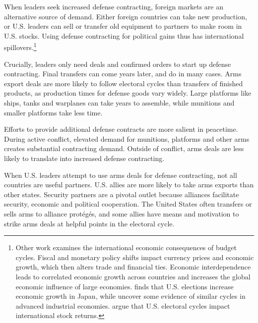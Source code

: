 \documentclass[12pt]{article}
\begin{document}
When leaders seek increased defense contracting, foreign markets are an alternative source of demand.
Either foreign countries can take new production, or U.S. leaders can sell or transfer old equipment to partners to make room in U.S. stocks. 
Using defense contracting for political gains thus has international spillovers.\footnote{%
Other work examines the international economic consequences of budget cycles.
Fiscal and monetary policy shifts impact currency prices and economic growth, which then alters trade and financial ties. 
Economic interdependence leads to correlated economic growth across countries \citep{ArtisZhang1999, Kayser2006} and increases the global economic influence of large economies. 
\citet{Ito1991} finds that U.S. elections increase economic growth in Japan, while \citet{ThompsonZuk1983} uncover some evidence of similar cycles in advanced industrial economies.
\citet{FoersterSchmitz1997} argue that U.S. electoral cycles impact international stock returns.
}


Crucially, leaders only need deals and confirmed orders to start up defense contracting. 
Final transfers can come years later, and do in many cases. 
Arms export deals are more likely to follow electoral cycles than transfers of finished products, as production times for defense goods vary widely. 
Large platforms like ships, tanks and warplanes can take years to assemble, while munitions and smaller platforms take less time. 


Efforts to provide additional defense contracts are more salient in peacetime. 
During active conflict, elevated demand for munitions, platforms and other arms creates substantial contracting demand. 
Outside of conflict, arms deals are less likely to translate into increased defense contracting. 


When U.S. leaders attempt to use arms deals for defense contracting, not all countries are useful partners. 
U.S. allies are more likely to take arms exports than other states. 
Security partners are a pivotal outlet because alliances facilitate security, economic and political cooperation.
The United States often transfers or sells arms to alliance prot{\'e}g{\'e}s, and some allies have means and motivation to strike arms deals at helpful points in the electoral cycle. 
\end{document}
